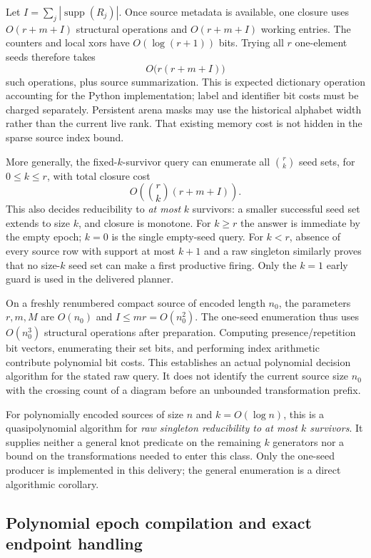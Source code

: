 Let $I=\sum_j|\operatorname{supp}(R_j)|$. Once source metadata is available,
one closure uses $O(r+m+I)$ structural operations and $O(r+m+I)$ working
entries. The counters and local xors have $O(\log(r+1))$ bits. Trying all
$r$ one-element seeds therefore takes
\[
 O\bigl(r(r+m+I)\bigr)
\]
such operations, plus source summarization. This is expected dictionary
operation accounting for the Python implementation; label and identifier
bit costs must be charged separately. Persistent arena masks may use the
historical alphabet width rather than the current live rank. That existing
memory cost is not hidden in the sparse source index bound.

More generally, the fixed-$k$-survivor query can enumerate all
$\binom rk$ seed sets, for $0\le k\le r$, with total closure cost
\[
 O\!\left(\binom rk(r+m+I)\right).
\]
This also decides reducibility to \emph{at most} $k$ survivors: a smaller
successful seed set extends to size $k$, and closure is monotone. For
$k\ge r$ the answer is immediate by the empty epoch; $k=0$ is the single
empty-seed query. For $k<r$, absence of every source row with support at
most $k+1$ and a raw singleton similarly proves that no size-$k$ seed set
can make a first productive firing. Only the $k=1$ early guard is used in
the delivered planner.

On a freshly renumbered compact source of encoded length $n_0$, the
parameters $r,m,M$ are $O(n_0)$ and $I\le mr=O(n_0^2)$. The one-seed
enumeration thus uses $O(n_0^3)$ structural operations after preparation.
Computing presence/repetition bit vectors, enumerating their set bits,
and performing index arithmetic contribute polynomial bit costs. This
establishes an actual polynomial decision algorithm for the stated raw
query. It does not identify the current source size $n_0$ with the
crossing count of a diagram before an unbounded transformation prefix.

For polynomially encoded sources of size $n$ and $k=O(\log n)$, this is a
quasipolynomial algorithm for \emph{raw singleton reducibility to at most
$k$ survivors}. It supplies neither a general knot predicate on the
remaining $k$ generators nor a bound on the transformations needed to enter
this class. Only the one-seed producer is implemented in this delivery;
the general enumeration is a direct algorithmic corollary.

\subsection{Polynomial epoch compilation and exact endpoint handling}

